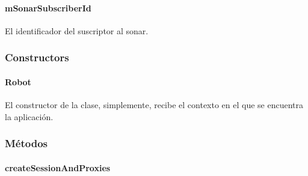 \paragraph{mSonarSubscriberId}
\label{\detokenize{dev_docs:msonarsubscriberid}}

\begin{fulllineitems}
\label{\detokenize{dev_docs:com.lar.cloudnao.Robot.mSonarSubscriberId}}
El identificador del suscriptor al sonar.

\end{fulllineitems}



\subsubsection{Constructors}
\label{\detokenize{dev_docs:constructors}}

\paragraph{Robot}
\label{\detokenize{dev_docs:id34}}

\begin{fulllineitems}
\label{\detokenize{dev_docs:com.lar.cloudnao.Robot.Robot(Context)}}
El constructor de la clase, simplemente, recibe el contexto en el que se encuentra la aplicación.

\end{fulllineitems}



\subsubsection{Métodos}
\label{\detokenize{dev_docs:id35}}

\paragraph{createSessionAndProxies}
\label{\detokenize{dev_docs:createsessionandproxies}}

